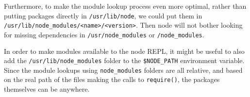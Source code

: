 Furthermore, to make the module lookup process even more optimal, rather
than putting packages directly in \texttt{/usr/lib/node}, we could put
them in
\texttt{/usr/lib/node\_modules/\textless{}name\textgreater{}/\textless{}version\textgreater{}}.
Then node will not bother looking for missing dependencies in
\texttt{/usr/node\_modules} or \texttt{/node\_modules}.

In order to make modules available to the node REPL, it might be useful
to also add the \texttt{/usr/lib/node\_modules} folder to the
\texttt{\$NODE\_PATH} environment variable. Since the module lookups
using \texttt{node\_modules} folders are all relative, and based on the
real path of the files making the calls to \texttt{require()}, the
packages themselves can be anywhere.
